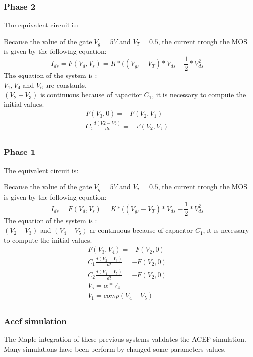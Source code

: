 \begin{figure}[!h]
\centerline{
 \scalebox{0.7}{
    
 }
 }\end{figure}



\subsubsection{Phase 2}
The equivalent circuit is:

Because the value of the gate $V_{g}=5V$ and $V_{T}=0.5$, the current trough the MOS is given by the following equation:
\[I_{ds}=F(V_{d},V_{s})=K *((V_{gs}-V_{T})*V_{ds} - \frac{1}{2}*V_{ds}^2 \]
The equation of the system is :\\
$V_{1}, V_{4}$ and $V_{6}$ are constants.\\
$(V_{2} - V_{3})$ is continuous because of capacitor $C_{1}$, it is necessary to compute the initial values.
\begin{eqnarray}
F(V_{3},0)=-F(V_{2},V_{1})\\
C_{1}\frac{d(V2-V3)}{dt} = -F(V_{2},V_{1})\\
\end{eqnarray}


\subsubsection{Phase 1}
The equivalent circuit is:

Because the value of the gate $V_{g}=5V$ and $V_{T}=0.5$, the current trough the MOS is given by the following equation:
\[I_{ds}=F(V_{d},V_{s})=K *((V_{gs}-V_{T})*V_{ds} - \frac{1}{2}*V_{ds}^2 \]
The equation of the system is :\\
$(V_{2} - V_{3})$ and  $(V_{4} - V_{5})$ ar continuous because of capacitor $C_{1}$, it is necessary to compute the initial values.
\begin{eqnarray}
F(V_{3},V_{4})=-F(V_{2},0)\\
C_{1}\frac{d(V_{2}-V_{3})}{dt} = -F(V_{2},0)\\
C_{2}\frac{d(V_{4}-V_{5})}{dt} = -F(V_{2},0)\\
V_{5}=\alpha*V_{4}\\
V_{1}=comp(V_{4}-V_{5})\\
\end{eqnarray}

\subsubsection{Acef simulation}
The Maple integration of these previous systems validates the ACEF simulation. Many simulations have
been perform by changed some parameters values.

